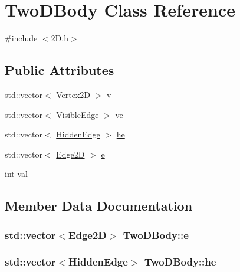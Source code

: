 \hypertarget{class_two_d_body}{}\section{Two\+D\+Body Class Reference}
\label{class_two_d_body}


{\ttfamily \#include $<$2\+D.\+h$>$}

\subsection*{Public Attributes}
\begin{DoxyCompactItemize}
\item 
std\+::vector$<$ \hyperlink{class_vertex2_d}{Vertex2D} $>$ \hyperlink{class_two_d_body_a28003130b9cd049b6ab0c750af18a7a0}{v}
\item 
std\+::vector$<$ \hyperlink{class_visible_edge}{Visible\+Edge} $>$ \hyperlink{class_two_d_body_ac7b38febf4667a16f07ff25b35bd818d}{ve}
\item 
std\+::vector$<$ \hyperlink{class_hidden_edge}{Hidden\+Edge} $>$ \hyperlink{class_two_d_body_a4123a65d4e19ad38a33bca38f121d4be}{he}
\item 
std\+::vector$<$ \hyperlink{class_edge2_d}{Edge2D} $>$ \hyperlink{class_two_d_body_aad63543ce0c13e2601701b3643997cc2}{e}
\item 
int \hyperlink{class_two_d_body_aa4bbe91c010e5547c9904590ad8d53b6}{val}
\end{DoxyCompactItemize}


\subsection{Member Data Documentation}
\subsubsection[{\texorpdfstring{e}{e}}]{\setlength{\rightskip}{0pt plus 5cm}std\+::vector$<${\bf Edge2D}$>$ Two\+D\+Body\+::e}\hypertarget{class_two_d_body_aad63543ce0c13e2601701b3643997cc2}{}\label{class_two_d_body_aad63543ce0c13e2601701b3643997cc2}
\subsubsection[{\texorpdfstring{he}{he}}]{\setlength{\rightskip}{0pt plus 5cm}std\+::vector$<${\bf Hidden\+Edge}$>$ Two\+D\+Body\+::he}\hypertarget{class_two_d_body_a4123a65d4e19ad38a33bca38f121d4be}{}\label{class_two_d_body_a4123a65d4e19ad38a33bca38f121d4be}
